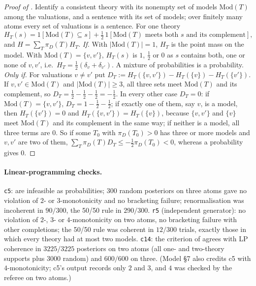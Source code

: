 \begin{proof}[Proof of ]
Identify a consistent theory with its nonempty set of models $\mathrm{Mod}(T)$ among the valuations, and a sentence with its set of models; over finitely many atoms every set of valuations is a sentence. For one theory
\[
H_T(s)=1[\mathrm{Mod}(T)\subseteq s]+\tfrac12\,1[\mathrm{Mod}(T)\text{ meets both }s\text{ and its complement}],
\]
and $H=\sum_T\pi_D(T)H_T$.
\emph{If.} With $|\mathrm{Mod}(T)|=1$, $H_T$ is the point mass on the model. With $\mathrm{Mod}(T)=\{v,v'\}$, $H_T(s)$ is $1$, $\tfrac12$ or $0$ as $s$ contains both, one or none of $v,v'$, i.e.\ $H_T=\tfrac12(\delta_v+\delta_{v'})$. A mixture of probabilities is a probability.
\emph{Only if.} For valuations $v\ne v'$ put $D_T:=H_T(\{v,v'\})-H_T(\{v\})-H_T(\{v'\})$. If $v,v'\in\mathrm{Mod}(T)$ and $|\mathrm{Mod}(T)|\ge3$, all three sets meet $\mathrm{Mod}(T)$ and its complement, so $D_T=\tfrac12-\tfrac12-\tfrac12=-\tfrac12$. In every other case $D_T=0$: if $\mathrm{Mod}(T)=\{v,v'\}$, $D_T=1-\tfrac12-\tfrac12$; if exactly one of them, say $v$, is a model, then $H_T(\{v'\})=0$ and $H_T(\{v,v'\})=H_T(\{v\})$, because $\{v,v'\}$ and $\{v\}$ meet $\mathrm{Mod}(T)$ and its complement in the same way; if neither is a model, all three terms are $0$. So if some $T_0$ with $\pi_D(T_0)>0$ has three or more models and $v,v'$ are two of them, $\sum_T\pi_D(T)D_T\le-\tfrac12\pi_D(T_0)<0$, whereas a probability gives $0$.
\end{proof}

\paragraph{Linear-programming checks.} \texttt{c5}:  are infeasible as probabilities; $300$ random posteriors on three atoms gave no violation of $2$- or $3$-monotonicity and no bracketing failure; renormalisation was incoherent in $90/300$, the 50/50 rule in $290/300$. \texttt{r5} (independent generator): no violation of $2$-, $3$- or $4$-monotonicity on two atoms, no bracketing failure with other completions; the 50/50 rule was coherent in $12/300$ trials, exactly those in which every theory had at most two models. \texttt{c14}: the criterion of  agrees with LP coherence in $3225/3225$ posteriors on two atoms (all one- and two-theory supports plus $3000$ random) and $600/600$ on three. (Model \S7 also credits c5 with $4$-monotonicity; c5's output records only $2$ and $3$, and $4$ was checked by the referee on two atoms.)

